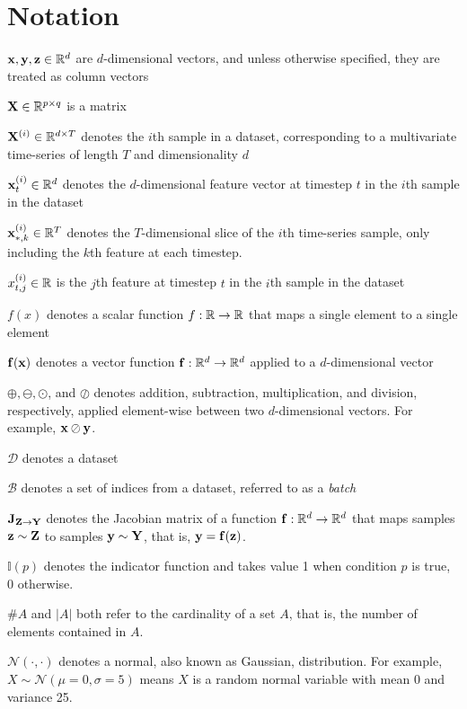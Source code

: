 \documentclass{statsmsc}
\begin{document}
{\chapter*{Notation}\thispagestyle{plain}
    $\mathbf{x}, \mathbf{y}, \mathbf{z}\in\mathbb{R}^d$ are $d$-dimensional vectors, and unless otherwise specified, they are
    treated as column vectors

    $\mathbf{X} \in \mathbb{R}^{p \times q}$ is a matrix

    $\mathbf{X}^{(i)} \in \mathbb{R}^{d \times T}$ denotes the $i$th sample in a dataset, corresponding to a multivariate time-series of length $T$ and dimensionality $d$

    $\mathbf{x}^{(i)}_t \in \mathbb{R}^d$ denotes the $d$-dimensional feature vector at timestep $t$ in the $i$th sample in the dataset

    $\mathbf{x}^{(i)}_{*,k} \in \mathbb{R}^T$ denotes the $T$-dimensional slice of the $i$th time-series sample, only including the $k$th feature at each timestep.

    $x^{(i)}_{t,j}\in\mathbb{R}$ is the $j$th feature at timestep $t$ in the $i$th sample in the dataset

    $f(x)$ denotes a scalar function $f: \mathbb{R} \rightarrow {\mathbb{R}}$ that maps a single element to a single element

    $\mathbf{f}(\mathbf{x})$ denotes a vector function $\mathbf{f}:\mathbb{R}^d \rightarrow {\mathbb{R}^d}$ applied to a $d$-dimensional vector

    $\oplus, \ominus, \odot$, and $\oslash$ denotes addition, subtraction, multiplication, and division, respectively, applied element-wise between two $d$-dimensional vectors. For example, $\mathbf{x} \oslash \mathbf{y}$.

    $\mathcal{D}$ denotes a dataset

    $\mathcal{B}$ denotes a set of indices from a dataset, referred to as a \textit{batch}

    $\mathbf{J}_{\mathbf{Z} \rightarrow {\mathbf{Y}}}$ denotes the Jacobian matrix of a function $\mathbf{f} : \mathbb{R}^d \rightarrow {\mathbb{R}^d}$ that maps samples $\mathbf{z} \sim \mathbf{Z}$ to samples $\mathbf{y} \sim \mathbf{Y}$, that is,
    $\mathbf{y}=\mathbf{f}(\mathbf{z})$.

    $\mathbb{I}(p)$ denotes the indicator function and takes value 1 when condition $p$ is true,
    0 otherwise.

    $\#A$ and $|A|$ both refer to the cardinality of a set $A$, that is, the number of elements contained in $A$.

    $\mathcal{N(\cdot,\cdot)}$ denotes a normal, also known as Gaussian,
    distribution. For example, $X \sim \mathcal{N}(\mu=0, \sigma=5)$ means $X$
    is a random normal variable with mean 0 and variance 25.

}
\end{document}
